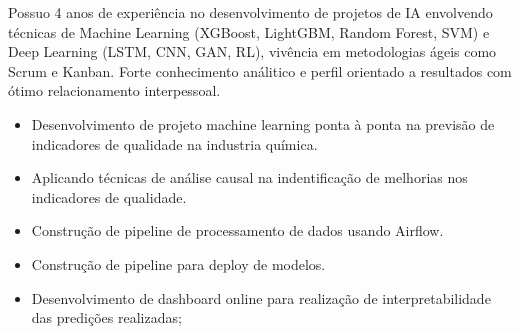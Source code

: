 \documentclass[10pt,a4paper,ragged2e]{altacv}
\begin{document}

\begin{fullwidth}
	\makecvheader
\end{fullwidth}




\justifying
Possuo 4 anos de experiência no desenvolvimento de projetos de IA envolvendo 
técnicas de Machine Learning (XGBoost, LightGBM, Random Forest, SVM) e Deep Learning  
(LSTM, CNN, GAN, RL), vivência em metodologias ágeis como Scrum 
e Kanban. Forte conhecimento análitico e perfil orientado a resultados com ótimo 
relacionamento interpessoal. 


\begin{itemize}
												
	\item Desenvolvimento de projeto machine learning ponta à ponta na previsão de
	      indicadores de qualidade na industria química.
	\item Aplicando técnicas de análise causal na indentificação de melhorias
	      nos indicadores de qualidade.
	\item Construção de pipeline de processamento de dados usando Airflow.
	\item Construção de pipeline para deploy de modelos.
	\item Desenvolvimento de dashboard online para realização de interpretabilidade
	      das predições realizadas;
	      	      	      	      	      	      	      	      	      	      	      	      
\end{itemize}
\end{document}
